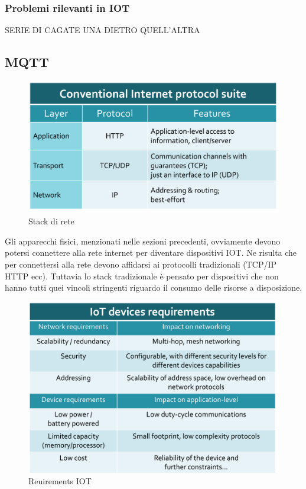 \documentclass[12pt]{article}
\begin{document}
    	\subsubsection{Problemi rilevanti in IOT}
    		SERIE DI CAGATE UNA DIETRO QUELL'ALTRA
    	\subsection{MQTT}
    		\begin{figure}[h!]
    			\centering
    			\includegraphics[scale=0.3]{img/stack.png}
    			\caption{Stack di rete}
    		\end{figure}
    		Gli apparecchi fisici, menzionati nelle sezioni precedenti, ovviamente devono potersi connettere alla rete internet per diventare dispositivi IOT. Ne risulta che per connettersi alla rete devono affidarsi ai protocolli tradizionali (TCP/IP HTTP ecc). Tuttavia lo stack tradizionale è pensato per dispositivi che non hanno tutti quei vincoli stringenti riguardo il consumo delle risorse a disposizione.
    		\begin{figure}[h!]
    			\centering
    			\includegraphics[scale=0.3]{img/iotreq.png}
    			\caption{Reuirements IOT}
    		\end{figure}
\end{document}
